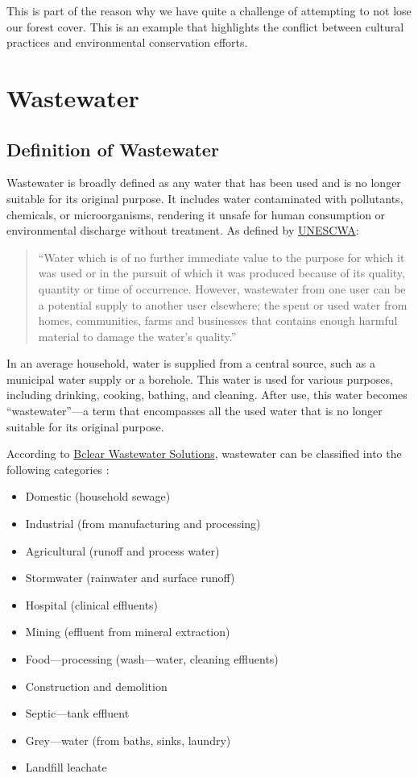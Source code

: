 This is part of the reason why we have quite a challenge of attempting to not lose our forest cover. This is an example that highlights the conflict between cultural practices and environmental conservation efforts.

\section{Wastewater}
\subsection{Definition of Wastewater}
Wastewater is broadly defined as any water that has been used and is no longer suitable for its original purpose. It includes water contaminated with pollutants, chemicals, or microorganisms, rendering it unsafe for human consumption or environmental discharge without treatment. As defined by \href{https://www.unescwa.org/about}{UNESCWA}:

\begin{quote}
    \centering
    \enquote{Water which is of no further immediate value to the purpose for which it was used or in the pursuit of which it was produced because of its quality, quantity or time of occurrence. However, wastewater from one user can be a potential supply to another user elsewhere; the spent or used water from homes, communities, farms and businesses that contains enough harmful material to damage the water’s quality.}~\cite{unescwaWastewaterDefinition}
\end{quote}

In an average household, water is supplied from a central source, such as a municipal water supply or a borehole. This water is used for various purposes, including drinking, cooking, bathing, and cleaning. After use, this water becomes \enquote{wastewater}—a term that encompasses all the used water that is no longer suitable for its original purpose.

According to \href{https://bclear-water.com/about-us/}{Bclear Wastewater Solutions}, wastewater can be classified into the following categories \cite{bclearWastewaterTypes}:

\begin{itemize}
  \item Domestic (household sewage)
  \item Industrial (from manufacturing and processing)
  \item Agricultural (runoff and process water)
  \item Stormwater (rainwater and surface runoff)
  \item Hospital (clinical effluents)
  \item Mining (effluent from mineral extraction)
  \item Food—processing (wash—water, cleaning effluents)
  \item Construction and demolition
  \item Septic—tank effluent
  \item Grey—water (from baths, sinks, laundry)
  \item Landfill leachate
\end{itemize}

